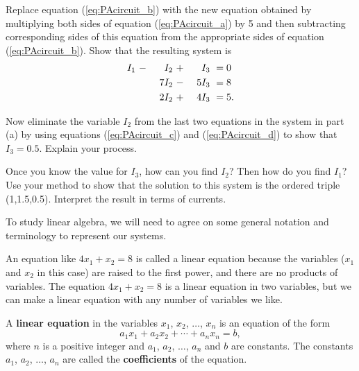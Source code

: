 \begin{pa}
    \ba
            \item Replace equation (\ref{eq:PAcircuit_b}) with the new equation obtained by multiplying both sides of equation (\ref{eq:PAcircuit_a}) by 5 and then subtracting corresponding sides of this equation from the appropriate sides of equation (\ref{eq:PAcircuit_b}).  Show that the resulting system is
        \begin{alignat}{4}
{}I_1 \	&- \	&{}I_2 \	&+ \	&{}I_3 \	&= 0  \notag \\
     \	&  \	&7I_2  \		&{-} \ 	&{5}I_3  \		&= 8 \label{eq:PAcircuit_d} \\
	\	&{} \ 	&2I_2 \		&+ \	&4I_3 \		&= 5. \notag
    \end{alignat}


         \item Now eliminate the variable $I_2$ from the last two equations in the system in part (a) by using equations (\ref{eq:PAcircuit_c}) and (\ref{eq:PAcircuit_d}) to show that $I_3=0.5$. Explain your process. 

        \item Once you know the value for $I_3$, how can you find $I_2$? Then how do you find $I_1$? Use your method to show that the solution to this system is the ordered triple (1,1.5,0.5). Interpret the result in terms of currents. 

	\ea

\ee

\end{pa}

\label{sec:notation}

To study linear algebra, we will need to agree on some general notation and terminology to represent our systems. 

An equation like $4x_1 + x_2 = 8$ is called a linear equation because the variables ($x_1$ and $x_2$ in this case) are raised to the first power, and there are no products of variables. The equation $4x_1 + x_2 = 8$ is a linear equation in two variables, but we can make a linear equation with any number of variables we like. 

\begin{definition} A \textbf{linear equation} in the variables $x_1$, $x_2$, $\ldots$, $x_n$ is an equation of the form
\[a_1x_1 + a_2x_2 + \cdots + a_nx_n = b,\]
where $n$ is a positive integer and $a_1$, $a_2$, $\ldots$, $a_n$ and $b$ are constants. The constants $a_1$, $a_2$, $\ldots$, $a_n$ are called the \textbf{coefficients} of the equation. 
\end{definition}

